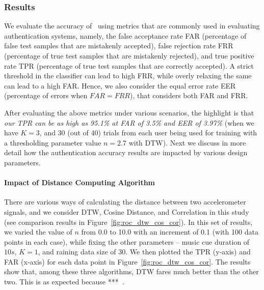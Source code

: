 \subsubsection{Results}
We evaluate the accuracy of \systemname~using metrics that are commonly used
in evaluating authentication systems, namely,
the false acceptance rate FAR (percentage of false test samples that are
mistakenly accepted), false rejection rate FRR (percentage of true test
samples that are mistakenly rejected), and true positive rate
TPR (percentage of true test samples that are correctly accepted).
A strict threshold in the classifier can lead to high FRR, while
overly relaxing the same can lead to a high FAR. Hence, we also consider
the equal error rate EER (percentage of errors when $FAR = FRR$), that
considers both FAR and FRR.


After evaluating the above metrics under various scenarios, the highlight is that \emph{our TPR can be as high as 95.1\% at FAR of 3.5\% and EER of 3.97\%} (when we have $K = 3$, and 30 (out of 40) trials from each user being used for training with a thresholding parameter value $n = 2.7$ with DTW). Next we discuss in more detail how the authentication accuracy results are impacted by various design parameters.

\paragraph{Impact of Distance Computing Algorithm}
There are various ways of calculating the distance between two accelerometer signals, and we consider DTW, Cosine Distance, and Correlation in this study (see comparison results in Figure~\ref{fig:roc_dtw_cos_cor}). In this set of results, we varied the value of $n$ from 0.0 to 10.0 with an increment of 0.1 (with 100 data points in each case), while fixing the other parameters -- music cue duration of $10s$, $K = 1$, and  raining data size of 30. We then plotted the TPR (y-axis) and FAR (x-axis) for each data point in Figure~\ref{fig:roc_dtw_cos_cor}. The results show that, among these three algorithms, DTW fares much better than the other two. This is as expected because ***~\cite{DTW}.


